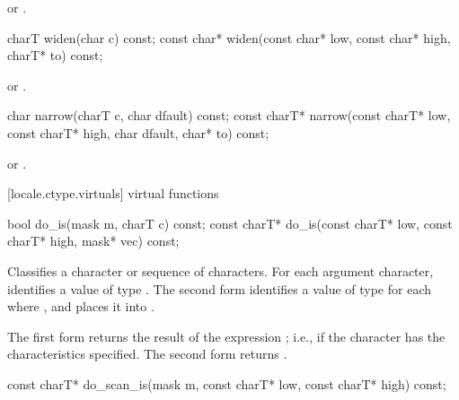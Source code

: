 \begin{itemdescr}
\pnum
\returns
{} or .
\end{itemdescr}

%
\begin{itemdecl}
charT       widen(char c) const;
const char* widen(const char* low, const char* high, charT* to) const;
\end{itemdecl}

\begin{itemdescr}
\pnum
\returns
{} or .
\end{itemdescr}

%
\begin{itemdecl}
char         narrow(charT c, char dfault) const;
const charT* narrow(const charT* low, const charT* high, char dfault, char* to) const;
\end{itemdecl}

\begin{itemdescr}
\pnum
\returns
{} or .
\end{itemdescr}

[locale.ctype.virtuals]{ virtual functions}

%
\begin{itemdecl}
bool         do_is(mask m, charT c) const;
const charT* do_is(const charT* low, const charT* high, mask* vec) const;
\end{itemdecl}

\begin{itemdescr}
\pnum
\effects
Classifies a character or sequence of characters.
For each argument character,
identifies a value  of type .
The second form identifies a value  of type 
for each  where ,
and places it into .

\pnum
\returns
The first form returns the result of the expression ;
i.e.,  if the character has the characteristics specified.
The second form returns .
\end{itemdescr}

%
\begin{itemdecl}
const charT* do_scan_is(mask m, const charT* low, const charT* high) const;
\end{itemdecl}

